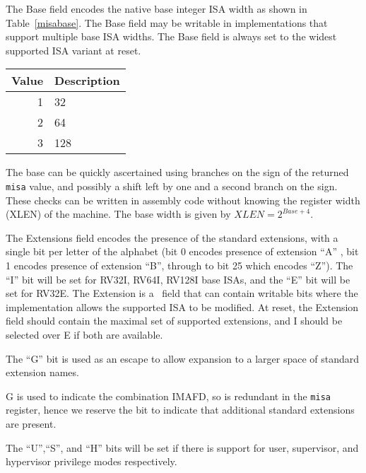 The Base field encodes the native base integer ISA width as shown in
Table~\ref{misabase}.  The Base field may be writable in
implementations that support multiple base ISA widths.  The Base field
is always set to the widest supported ISA variant at reset.

\begin{table*}[h!]
\begin{center}
\begin{tabular}{|r|l|}
\hline
Value  & Description \\
\hline	 
1   & 32 \\
2   & 64 \\
3   & 128 \\
\hline
\end{tabular}
\end{center}
\caption{Encoding of Base field in {\tt misa}}
\label{misabase}
\end{table*}

\begin{commentary}
The base can be quickly ascertained using branches on the sign of the
returned {\tt misa} value, and possibly a shift left by one and a
second branch on the sign.  These checks can be written in assembly
code without knowing the register width (XLEN) of the machine.
The base width is given by $XLEN=2^{Base+4}$.
\end{commentary}

The Extensions field encodes the presence of the standard extensions,
with a single bit per letter of the alphabet (bit 0 encodes presence
of extension ``A'' , bit 1 encodes presence of extension ``B'',
through to bit 25 which encodes ``Z'').  The ``I'' bit will be set for
RV32I, RV64I, RV128I base ISAs, and the ``E'' bit will be set for
RV32E.  The Extension is a \warl\ field that can contain writable bits
where the implementation allows the supported ISA to be modified.  At
reset, the Extension field should contain the maximal set of supported
extensions, and I should be selected over E if both are available.

The ``G'' bit is used as an escape to allow expansion to a larger
space of standard extension names.
\begin{commentary}
G is used to indicate the combination IMAFD, so is redundant in the
{\tt misa} register, hence we reserve the bit to indicate that
additional standard extensions are present.
\end{commentary}

The ``U'',``S'', and ``H'' bits will be set if there is support for
user, supervisor, and hypervisor privilege modes respectively.

